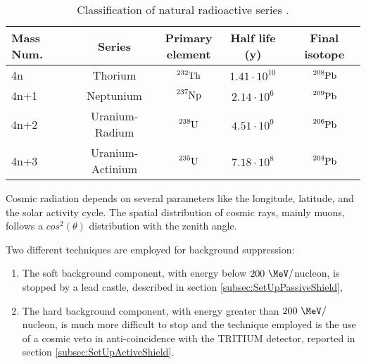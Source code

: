 \begin{table}[htbp]
\centering{}%
\begin{tabular}{lcccc}
\toprule 
Mass Num. & Series & \parbox{8em}{\centering Primary\\ element} & Half life (y) & Final isotope \tabularnewline
\midrule
\midrule 
4n & Thorium & $\ce{^{232}Th}$ & $1.41 \cdot{} 10^{10}$ & $\ce{^{208}Pb}$ \tabularnewline
4n+1 & Neptunium & $\ce{^{237}Np}$ & $2.14 \cdot{} 10^{6}$ & $\ce{^{209}Pb}$ \tabularnewline
4n+2 & Uranium-Radium & $\ce{^{238}U}$ & $4.51 \cdot{} 10^{9}$ & $\ce{^{206}Pb}$ \tabularnewline
4n+3 & Uranium-Actinium & $\ce{^{235}U}$ & $7.18 \cdot{} 10^{8}$ & $\ce{^{204}Pb}$ \tabularnewline
\bottomrule
\end{tabular}
\caption{Classification of natural radioactive series \cite{NaturalRadioactiveSeries1, NaturalRadioactiveSeries2}.}
\label{tab:NaturalRadioactiveSeries}
\end{table}
Cosmic radiation depends on several parameters like the longitude, latitude, and the solar activity cycle. The spatial distribution of cosmic rays, mainly muons, follows a $cos^2(\theta)$ distribution with the zenith angle. 

Two different techniques are employed for background suppression:

\begin{enumerate}

\item{}  The soft background component, with energy below $200~\MeV/$nucleon, is stopped by a lead castle, described in section \ref{subsec:SetUpPassiveShield},

\item{} The hard background component, with energy greater than $200~\MeV/$nucleon, is much more difficult to stop and the technique employed is the use of a cosmic veto in anti-coincidence with the TRITIUM detector, reported in section \ref{subsec:SetUpActiveShield}. %

\end{enumerate}